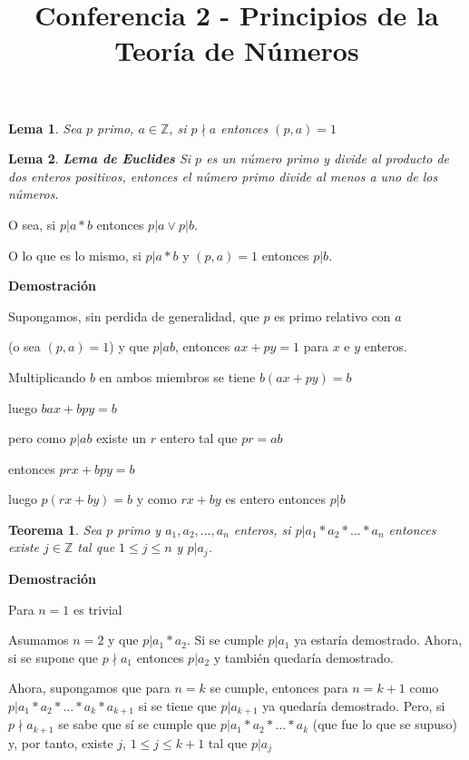 \documentclass[a4paper,12pt]{report}
\title{Conferencia 2 - Principios de la Teoría de Números}
\author{}
\newtheorem*{teo}{Teorema}
\newtheorem*{lem}{Lema}
\begin{document}
\maketitle


\begin{lem}
 Sea $p$ primo, $a\in\mathbb{Z}$, si $p\nmid a$ entonces $(p,a)=1$
\end{lem}

\begin{lem}
 \textbf{Lema de Euclides} Si $p$ es un número primo y divide al producto de dos enteros positivos, entonces el número primo divide al menos a uno de los números. 
\end{lem}

O sea, si $p|a*b$ entonces $p|a\vee p|b$. 

O lo que es lo mismo, si $p|a*b$ y $(p,a)=1$ entonces $p|b$.

\textbf{Demostración}

Supongamos, sin perdida de generalidad, que $p$ es primo relativo con $a$

(o sea $(p,a)=1$) y que $p|ab$, entonces $ax+py=1$ para $x$ e $y$ enteros.

Multiplicando $b$ en ambos miembros se tiene $b(ax+py)=b$ 

luego $bax+bpy=b$

pero como $p|ab$ existe un $r$ entero tal que $pr=ab$

entonces $prx+bpy=b$

luego $p(rx+by)=b$ y como $rx+by$ es entero entonces $p|b$

\begin{teo}
 Sea $p$ primo y $a_1,a_2,\dots,a_n$ enteros, si $p|a_1*a_2*\dots*a_n$ entonces existe $j\in\mathbb{Z}$ tal que $1\leq j\leq n$  y $p|a_j$.
\end{teo}

\textbf{Demostración}

Para $n=1$ es trivial

Asumamos $n=2$ y que $p|a_1*a_2$.  Si se cumple $p|a_1$ ya estaría demostrado. Ahora, si se supone que $p\nmid a_1$ entonces $p|a_2$ y también quedaría demostrado.

Ahora, supongamos que para $n=k$ se cumple, entonces para $n=k+1$ como $p|a_1*a_2*\dots *a_k*a_{k+1}$ si se tiene que $p|a_{k+1}$ ya quedaría demostrado. Pero, si $p\nmid a_{k+1}$ se sabe que sí se cumple que $p|a_1*a_2*\dots *a_k$ (que fue lo que se supuso) y, por tanto, existe $j$, $1\leq j \leq k+1$ tal que $p|a_j$
\end{document}
